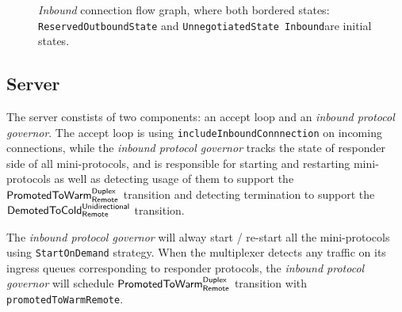 \documentclass{article}
\def\ReservedOutboundState{\texttt{ReservedOutboundState}}
\def\UnnegotiatedStateIn{\texttt{UnnegotiatedState Inbound}}
\def\DuplexState{\texttt{DuplexState}}
\def\InboundStateUni{\texttt{InboundState Unidirectional}}
\def\InboundStateDup{\texttt{InboundState Duplex}}
\def\PromotedToWarmDupRem{$\text{\textsf{PromotedToWarm}}^\text{\textsf{Duplex}}_\text{\textsf{Remote}}$}
\def\DemotedToColdUniRem{$\text{\textsf{DemotedToCold}}^\text{\textsf{Unidirectional}}_\text{\textsf{Remote}}$}
\def\inbgov{\textit{inbound protocol governor}}
\begin{document}
\begin{figure}[h]
  \footnotesize{}
  \caption{\textit{Inbound} connection flow graph, where both bordered states:
  \ReservedOutboundState{} and \UnnegotiatedStateIn are initial states.}
\end{figure}

\subsection{Server}

The server constists of two components: an accept loop and an \inbgov{}.  The
accept loop is using \texttt{includeInboundConnnection} on incoming
connections, while the \inbgov{} tracks the state of responder side of all
mini-protocols, and is responsible for starting and restarting mini-protocols
as well as detecting usage of them to support the \PromotedToWarmDupRem{}
transition and detecting termination to support the \DemotedToColdUniRem{}
transition.

The \inbgov{} will alway start / re-start all the mini-protocols using
\texttt{StartOnDemand} strategy.  When the multiplexer detects
any traffic on its ingress queues corresponding to responder protocols, the
\inbgov{} will schedule \PromotedToWarmDupRem{} transition with
\texttt{promotedToWarmRemote}.
\end{document}
